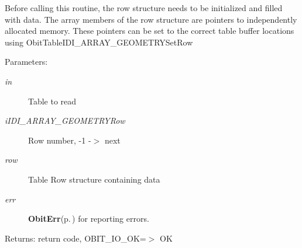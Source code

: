 Before calling this routine, the row structure needs to be initialized and filled with data. The array members of the row structure are pointers to independently allocated memory. These pointers can be set to the correct table buffer locations using Obit\-Table\-IDI\_\-ARRAY\_\-GEOMETRYSet\-Row \begin{Desc}
\item[Parameters:]
\begin{description}
\item[{\em in}]Table to read \item[{\em i\-IDI\_\-ARRAY\_\-GEOMETRYRow}]Row number, -1 -$>$ next \item[{\em row}]Table Row structure containing data \item[{\em err}]{\bf Obit\-Err}{\rm (p.\,\pageref{structObitErr})} for reporting errors. \end{description}
\end{Desc}
\begin{Desc}
\item[Returns:]return code, OBIT\_\-IO\_\-OK=$>$ OK \end{Desc}
